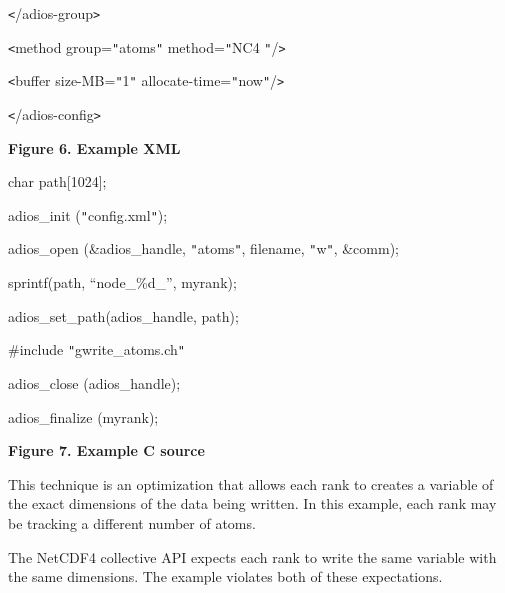 \vspace{10pt}
\parindent=14pt
\texttt{<}/adios-group\texttt{>}

\vspace{10pt}
\parindent=0pt
\texttt{<}method group=\texttt{"}atoms\texttt{"} method=\texttt{"}NC4 \texttt{"}/\texttt{>}

\vspace{10pt}
\texttt{<}buffer size-MB=\texttt{"}1\texttt{"} allocate-time=\texttt{"}now\texttt{"}/\texttt{>}

\vspace{10pt}
\texttt{<}/adios-config\texttt{>}

\label{HToc144350165}

\vspace{22pt}
{\color{color20} \textbf{Figure 6. Example XML}}



\vspace{22pt}
char path[1024];

\vspace{10pt}
adios\_init (\texttt{"}config.xml\texttt{"});

\vspace{10pt}
adios\_open (\&adios\_handle, \texttt{"}atoms\texttt{"}, filename, \texttt{"}w\texttt{"}, 
\&comm);

\vspace{10pt}
sprintf(path, ``node\_\%d\_'', myrank);

\vspace{10pt}
adios\_set\_path(adios\_handle, path);

\vspace{10pt}
\#include \texttt{"}gwrite\_atoms.ch\texttt{"}

\vspace{10pt}
adios\_close (adios\_handle);

\vspace{10pt}
adios\_finalize (myrank);

\vspace{22pt}
{\color{color20} \textbf{Figure 7. Example C source}}

\vspace{10pt}
\leftskip=0pt
This technique is an optimization that allows each rank to creates a variable of 
the exact dimensions of the data being written.  In this example, each rank may 
be tracking a different number of atoms.

\vspace{10pt}
The NetCDF4 collective API expects each rank to write the same variable with the 
same dimensions.  The example violates both of these expectations.

